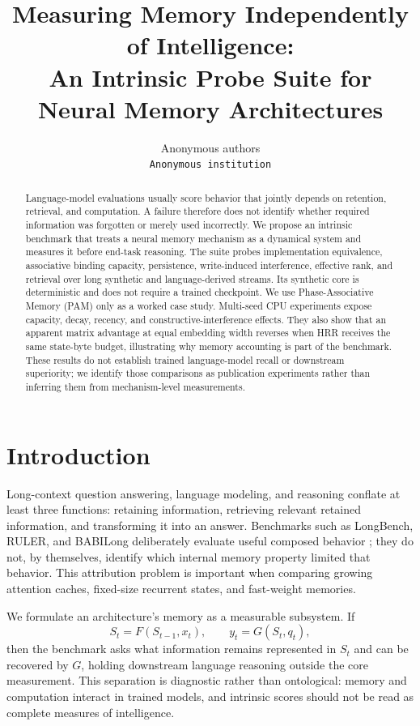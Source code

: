 \documentclass[10pt,twocolumn]{article}
\title{\textbf{Measuring Memory Independently of Intelligence:}\\
An Intrinsic Probe Suite for Neural Memory Architectures}
\author{Anonymous authors\\
\texttt{Anonymous institution}}
\date{}
\newcommand{\pam}{\textsc{PAM}}
\begin{document}
\maketitle

\begin{abstract}
Language-model evaluations usually score behavior that jointly depends on
retention, retrieval, and computation.  A failure therefore does not identify
whether required information was forgotten or merely used incorrectly.  We
propose an intrinsic benchmark that treats a neural memory mechanism as a
dynamical system and measures it before end-task reasoning.  The suite probes
implementation equivalence, associative binding capacity, persistence,
write-induced interference, effective rank, and retrieval over long synthetic
and language-derived streams.  Its synthetic core is deterministic and does
not require a trained checkpoint.  We use Phase-Associative Memory (\pam) only
as a worked case study.  Multi-seed CPU experiments expose capacity, decay,
recency, and constructive-interference effects.  They also show that an
apparent matrix advantage at equal embedding width reverses when HRR receives
the same state-byte budget, illustrating why memory accounting is part of the
benchmark.  These results do not establish trained language-model recall or
downstream superiority; we identify those comparisons as publication
experiments rather than inferring them from mechanism-level measurements.
\end{abstract}

\section{Introduction}
\label{sec:introduction}

Long-context question answering, language modeling, and reasoning conflate at
least three functions: retaining information, retrieving relevant retained
information, and transforming it into an answer.  Benchmarks such as
LongBench, RULER, and BABILong deliberately evaluate useful composed behavior
\cite{bai2023longbench,hsieh2024ruler,kuratov2024babilong}; they do not, by
themselves, identify which internal memory property limited that behavior.
This attribution problem is important when comparing growing attention
caches, fixed-size recurrent states, and fast-weight memories.

We formulate an architecture's memory as a measurable subsystem.  If
\begin{equation}
  S_t = F(S_{t-1},x_t), \qquad y_t = G(S_t,q_t),
  \label{eq:dynamics}
\end{equation}
then the benchmark asks what information remains represented in $S_t$ and can
be recovered by $G$, holding downstream language reasoning outside the core
measurement.  This separation is diagnostic rather than ontological:
memory and computation interact in trained models, and intrinsic scores should
not be read as complete measures of intelligence.
\end{document}
